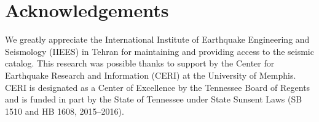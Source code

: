 
\section{Acknowledgements}

We greatly appreciate the International Institute of Earthquake Engineering and Seismology (IIEES) in Tehran for maintaining and providing access to the seismic catalog. This research was possible thanks to support by the Center for Earthquake Research and Information (CERI) at the University of Memphis. CERI is designated as a Center of Excellence by the Tennessee Board of Regents and is funded in part by the State of Tennessee under State Sunsent Laws (SB 1510 and HB 1608, 2015--2016).